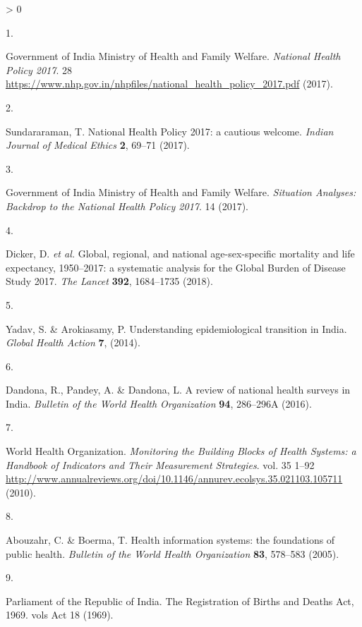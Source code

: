 \documentclass[
]{article}
\newlength{\cslhangindent}
\newlength{\csllabelwidth}
\newenvironment{CSLReferences}[2] %
 {%
  \setlength{\parindent}{0pt}
  \ifodd #1 \everypar{\setlength{\hangindent}{\cslhangindent}}\ignorespaces\fi
  \ifnum #2 > 0
  \setlength{\parskip}{#2\baselineskip}
  \fi
 }%
 {}
\newcommand{\CSLLeftMargin}[1]{\parbox[t]{\csllabelwidth}{#1}}
\newcommand{\CSLRightInline}[1]{\parbox[t]{\linewidth - \csllabelwidth}{#1}\break}
\begin{document}
\hypertarget{refs}{}
\begin{CSLReferences}{0}{0}
\leavevmode\hypertarget{ref-IND_MOHFW2017}{}%
\CSLLeftMargin{1. }
\CSLRightInline{Government of India Ministry of Health and Family Welfare. \emph{{National Health Policy 2017}}. 28 \url{https://www.nhp.gov.in/nhpfiles/national_health_policy_2017.pdf} (2017).}

\leavevmode\hypertarget{ref-Sundararaman2017}{}%
\CSLLeftMargin{2. }
\CSLRightInline{Sundararaman, T. {National Health Policy 2017: a cautious welcome}. \emph{Indian Journal of Medical Ethics} \textbf{2}, 69--71 (2017).}

\leavevmode\hypertarget{ref-IND_MOHFW2017a}{}%
\CSLLeftMargin{3. }
\CSLRightInline{Government of India Ministry of Health and Family Welfare. \emph{{Situation Analyses: Backdrop to the National Health Policy 2017}}. 14 (2017).}

\leavevmode\hypertarget{ref-Dicker2018}{}%
\CSLLeftMargin{4. }
\CSLRightInline{Dicker, D. \emph{et al.} {Global, regional, and national age-sex-specific mortality and life expectancy, 1950--2017: a systematic analysis for the Global Burden of Disease Study 2017}. \emph{The Lancet} \textbf{392}, 1684--1735 (2018).}

\leavevmode\hypertarget{ref-Yadav2014}{}%
\CSLLeftMargin{5. }
\CSLRightInline{Yadav, S. \& Arokiasamy, P. {Understanding epidemiological transition in India}. \emph{Global Health Action} \textbf{7}, (2014).}

\leavevmode\hypertarget{ref-Dandona2016}{}%
\CSLLeftMargin{6. }
\CSLRightInline{Dandona, R., Pandey, A. \& Dandona, L. {A review of national health surveys in India}. \emph{Bulletin of the World Health Organization} \textbf{94}, 286--296A (2016).}

\leavevmode\hypertarget{ref-WorldHealthOrganization2010}{}%
\CSLLeftMargin{7. }
\CSLRightInline{World Health Organization. \emph{{Monitoring the Building Blocks of Health Systems: a Handbook of Indicators and Their Measurement Strategies}}. vol. 35 1--92 \url{http://www.annualreviews.org/doi/10.1146/annurev.ecolsys.35.021103.105711} (2010).}

\leavevmode\hypertarget{ref-Abouzahr2005}{}%
\CSLLeftMargin{8. }
\CSLRightInline{Abouzahr, C. \& Boerma, T. {Health information systems: the foundations of public health}. \emph{Bulletin of the World Health Organization} \textbf{83}, 578--583 (2005).}

\leavevmode\hypertarget{ref-ParliamentoftheRepublicofIndia1969}{}%
\CSLLeftMargin{9. }
\CSLRightInline{Parliament of the Republic of India. {The Registration of Births and Deaths Act, 1969}. vols Act 18 (1969).}


\end{CSLReferences}
\end{document}
